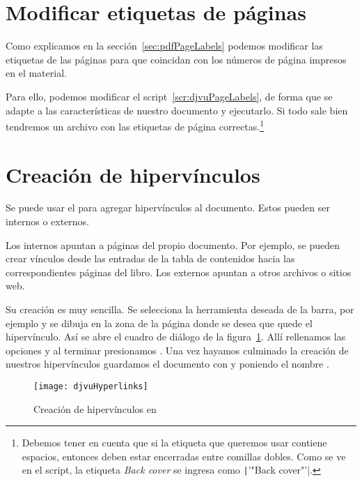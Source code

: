 \documentclass[%
	a5paper,
	10pt,
	twoside,
	openright,
	final,
]{memoir}
\begin{document}

	\section{Modificar etiquetas de páginas\label{sec:djvuPageLabels}} Como explicamos en la sección~\ref{sec:pdfPageLabels} podemos modificar las etiquetas de las páginas para que coincidan con los números de página impresos en el material.

	Para ello, podemos modificar el script~\ref{scr:djvuPageLabels}, de forma que se adapte a las características de nuestro documento y ejecutarlo. Si todo sale bien tendremos un archivo  con las etiquetas de página correctas.\footnote{Debemos tener en cuenta que si la etiqueta que queremos usar contiene espacios, entonces deben estar encerradas entre comillas dobles. Como se ve en el script, la etiqueta \emph{Back cover} se ingresa como \texttt|'"Back cover"'|.}


	\section{Creación de hipervínculos\label{sec:djvuHyperlinks}} Se puede usar el \djvueditor para agregar hipervínculos al documento. Estos pueden ser internos o externos.
	
	Los internos apuntan a páginas del propio documento. Por ejemplo, se pueden crear vínculos desde las entradas de la tabla de contenidos hacia las correspondientes páginas del libro. Los externos apuntan a otros archivos o sitios web.
	
	Su creación es muy sencilla. Se selecciona la herramienta deseada de la barra, por ejemplo  y se dibuja en la zona de la página donde se desea que quede el hipervínculo. Así se abre el cuadro de diálogo de la figura~\ref{fig:djvuHyperlinks}. Allí rellenamos las opciones y al terminar presionamos . Una vez hayamos culminado la creación de nuestros hipervínculos guardamos el documento con  y poniendo el nombre .

	\begin{figure}
		\texttt{[image: djvuHyperlinks]}
		\caption{Creación de hipervínculos en \djvueditor\label{fig:djvuHyperlinks}}
	\end{figure}
\end{document}
